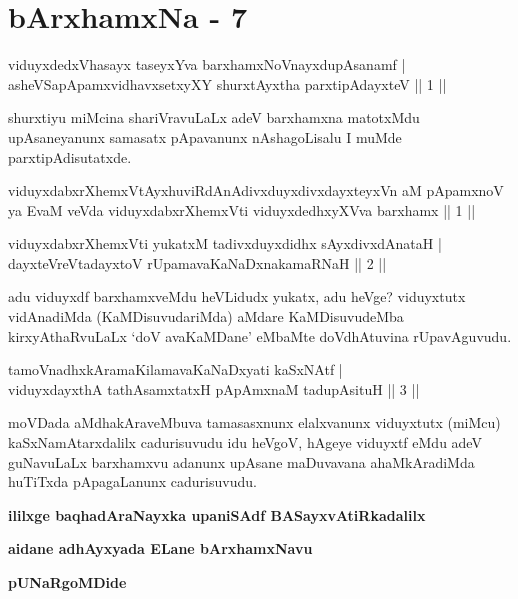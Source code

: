\chapter{bArxhamxNa - 7}

\begin{shl}
viduyxdedxVhasayx taseyxYva barxhamxNoV\s nayxdupAsanamf | \\
asheVSapApamxvidhavxsetxyXY shurxtAyx\s tha parxtipAdayxteV \hfill ||  1 || 
\end{shl}

\begin{artha}
shurxtiyu miMcina shariVravuLaLx adeV barxhamxna matotxMdu upAsaneyanunx samasatx pApavanunx nAshagoLisalu I muMde parxtipAdisutatxde.
\end{artha}

\begin{kandikeshl}
viduyxdabxrXhemxVtAyxhuviRdAnAdivxduyxdivxdayxteyxVn aM pApamxnoV ya EvaM veVda viduyxdabxrXhemxVti viduyxdedhxyXVva barxhamx || 1 ||
\end{kandikeshl}


\begin{shl}
viduyxdabxrXhemxVti yukatxM tadivxduyxdidhx sAyxdivxdAnataH | \\
dayxteVreVtadayxtoV rUpamavaKaNaDxnakamaRNaH \hfill ||  2 || 
\end{shl}

\begin{artha}
adu viduyxdf barxhamxveMdu heVLidudx yukatx, adu heVge? viduyxtutx vidAnadiMda (KaMDisuvudariMda) aMdare KaMDisuvudeMba kirxyAthaRvuLaLx `doV avaKaMDane' eMbaMte doVdhAtuvina rUpavAguvudu.
\end{artha}

\begin{shl}
tamoV\s nadhxkAramaKilamavaKaNaDxyati kaSxNAtf  | \\
viduyxdayxthA tathA\s samxtatxH pApAmxnaM tadupAsituH \hfill ||  3 ||
\end{shl}

\begin{artha}
moVDada aMdhakAraveMbuva tamasasxnunx elalxvanunx viduyxtutx (miMcu) kaSxNamAtarxdalilx cadurisuvudu idu heVgoV, hAgeye viduyxtf eMdu adeV guNavuLaLx barxhamxvu adanunx upAsane maDuvavana ahaMkAradiMda huTiTxda pApagaLanunx cadurisuvudu.
\end{artha}

\begin{center}
{\bf ililxge baqhadAraNayxka upaniSAdf BASayxvAtiRkadalilx}
\smallskip

{\bf aidane adhAyxyada ELane bArxhamxNavu}
\smallskip

{\bf pUNaRgoMDide}
\end{center}
